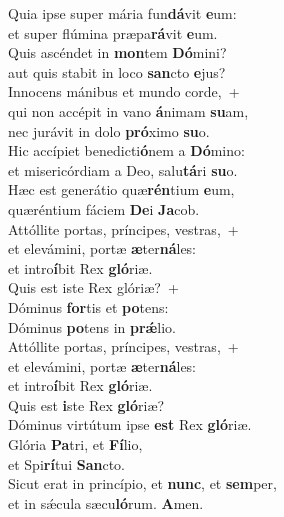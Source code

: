 \evenverse Quia ipse super mária fun\textbf{dá}vit \textbf{e}um:~\*\\
\evenverse et super flúmina præpa\textbf{rá}vit \textbf{e}um.\\
\oddverse Quis ascéndet in \textbf{mon}tem \textbf{Dó}mini?~\*\\
\oddverse aut quis stabit in loco \textbf{san}cto \textbf{e}jus?\\
\evenverse Innocens mánibus et mundo corde,~+\\
\evenverse  qui non accépit in vano \textbf{á}nimam \textbf{su}am,~\*\\
\evenverse nec jurávit in dolo \textbf{pró}ximo \textbf{su}o.\\
\oddverse Hic accípiet benedicti\textbf{ó}nem a \textbf{Dó}mino:~\*\\
\oddverse et misericórdiam a Deo, salu\textbf{tá}ri \textbf{su}o.\\
\evenverse Hæc est generátio quæ\textbf{rén}tium \textbf{e}um,~\*\\
\evenverse quæréntium fáciem \textbf{De}i \textbf{Ja}cob.\\
\oddverse Attóllite portas, príncipes, vestras,~+\\
\oddverse  et elevámini, portæ \textbf{æ}ter\textbf{ná}les:~\*\\
\oddverse et intro\textbf{í}bit Rex \textbf{gló}riæ.\\
\evenverse Quis est iste Rex glóriæ?~+\\
\evenverse  Dóminus \textbf{for}tis et \textbf{po}tens:~\*\\
\evenverse Dóminus \textbf{po}tens in \textbf{prǽ}lio.\\
\oddverse Attóllite portas, príncipes, vestras,~+\\
\oddverse  et elevámini, portæ \textbf{æ}ter\textbf{ná}les:~\*\\
\oddverse et intro\textbf{í}bit Rex \textbf{gló}riæ.\\
\evenverse Quis est \textbf{i}ste Rex \textbf{gló}riæ?~\*\\
\evenverse Dóminus virtútum ipse \textbf{est} Rex \textbf{gló}riæ.\\
\oddverse Glória \textbf{Pa}tri, et \textbf{Fí}lio,~\*\\
\oddverse et Spi\textbf{rí}tui \textbf{San}cto.\\
\evenverse Sicut erat in princípio, et \textbf{nunc}, et \textbf{sem}per,~\*\\
\evenverse et in sǽcula sæcu\textbf{ló}rum. \textbf{A}men.\\
